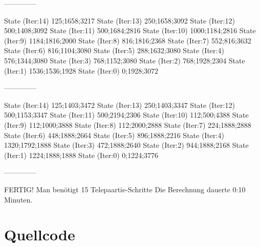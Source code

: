 \documentclass[a4paper,10pt,ngerman]{scrartcl}
\begin{document}
\begin{lstcs}
--------------

State (Iter:14) {125;1658;3217}
State (Iter:13) {250;1658;3092}
State (Iter:12) {500;1408;3092}
State (Iter:11) {500;1684;2816}
State (Iter:10) {1000;1184;2816}
State (Iter:9) {1184;1816;2000}
State (Iter:8) {816;1816;2368}
State (Iter:7) {552;816;3632}
State (Iter:6) {816;1104;3080}
State (Iter:5) {288;1632;3080}
State (Iter:4) {576;1344;3080}
State (Iter:3) {768;1152;3080}
State (Iter:2) {768;1928;2304}
State (Iter:1) {1536;1536;1928}
State (Iter:0) {0;1928;3072}

--------------

State (Iter:14) {125;1403;3472}
State (Iter:13) {250;1403;3347}
State (Iter:12) {500;1153;3347}
State (Iter:11) {500;2194;2306}
State (Iter:10) {112;500;4388}
State (Iter:9) {112;1000;3888}
State (Iter:8) {112;2000;2888}
State (Iter:7) {224;1888;2888}
State (Iter:6) {448;1888;2664}
State (Iter:5) {896;1888;2216}
State (Iter:4) {1320;1792;1888}
State (Iter:3) {472;1888;2640}
State (Iter:2) {944;1888;2168}
State (Iter:1) {1224;1888;1888}
State (Iter:0) {0;1224;3776}

--------------


FERTIG!
Man benötigt 15 Telepaartie-Schritte
Die Berechnung dauerte 0:10 Minuten.
\end{lstcs}

\section{Quellcode}
\end{document}
